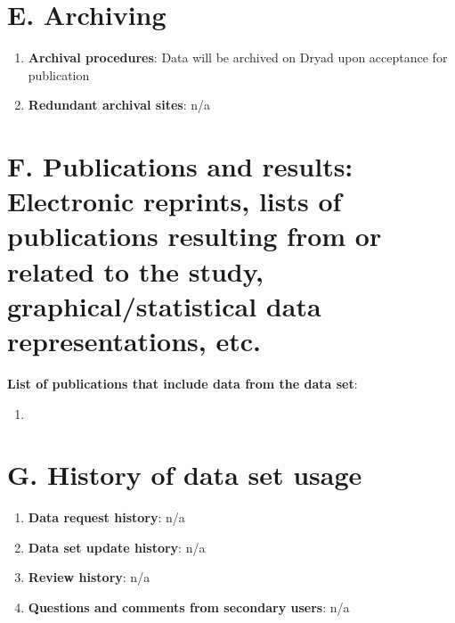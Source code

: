 \documentclass[a4paper,twoside,12pt]{article}
\begin{document}
    \section*{E. Archiving}
    		\begin{enumerate}
    		 \item \textbf{Archival procedures}: Data will be archived on Dryad upon acceptance for publication
        	 \item \textbf{Redundant archival sites}: n/a
    		\end{enumerate}
       
    \section*{F. Publications and results: Electronic reprints, lists of publications resulting from or related to the study, graphical/statistical data representations, etc.}
\textbf{List of publications that include data from the data set}:
		\begin{enumerate}
			\item 
		\end{enumerate}
    
   \section*{G. History of data set usage}
  		\begin{enumerate}
  			\item \textbf{Data request history}: n/a
        		\item \textbf{Data set update history}: n/a
        		\item \textbf{Review history}: n/a
       		\item \textbf{Questions and comments from secondary users}: n/a
  		\end{enumerate}
       


\clearpage

\end{document}
